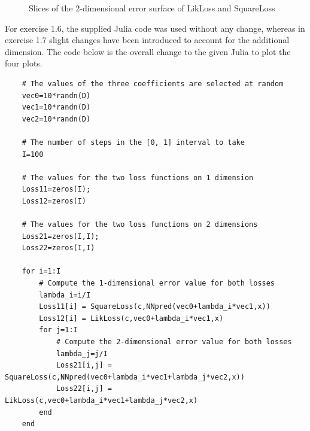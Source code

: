 \documentclass[fleqn]{report}
\begin{document}
\begin{figure}
    \centering
    \qquad
    \caption{Slices of the 2-dimensional error surface of LikLoss and SquareLoss}
    \label{fig:ex17}
\end{figure}
For exercise 1.6, the supplied Julia code was used without any change, whereas in exercise 1.7 slight changes have been introduced to account for the additional dimension. The code below is the overall change to the given Julia to plot the four plots.
\begin{verbatim}
    # The values of the three coefficients are selected at random
    vec0=10*randn(D)
    vec1=10*randn(D)
    vec2=10*randn(D)
    
    # The number of steps in the [0, 1] interval to take
    I=100
    
    # The values for the two loss functions on 1 dimension
    Loss11=zeros(I);
    Loss12=zeros(I)
    
    # The values for the two loss functions on 2 dimensions
    Loss21=zeros(I,I);
    Loss22=zeros(I,I)
    
    for i=1:I
        # Compute the 1-dimensional error value for both losses
        lambda_i=i/I
        Loss11[i] = SquareLoss(c,NNpred(vec0+lambda_i*vec1,x))
        Loss12[i] = LikLoss(c,vec0+lambda_i*vec1,x)
        for j=1:I
            # Compute the 2-dimensional error value for both losses
            lambda_j=j/I
            Loss21[i,j] = SquareLoss(c,NNpred(vec0+lambda_i*vec1+lambda_j*vec2,x))
            Loss22[i,j] = LikLoss(c,vec0+lambda_i*vec1+lambda_j*vec2,x)
        end
    end
\end{verbatim}
\end{document}
